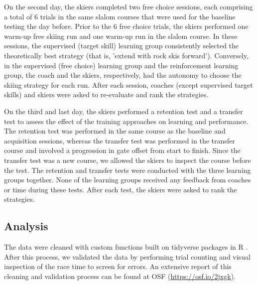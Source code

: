 \documentclass[pdflatex,sn-nature]{sn-jnl}%
\theoremstyle{thmstyleone}%
\theoremstyle{thmstyletwo}%
\theoremstyle{thmstylethree}%
\begin{document}
On the second day, the skiers completed two free choice sessions, each comprising a total of 6 trials in the same slalom courses that were used for the baseline testing the day before. Prior to the 6 free choice trials, the skiers performed one warm-up free skiing run and one warm-up run in the slalom course. In these sessions, the supervised (target skill) learning group consistently selected the theoretically best strategy (that is, 'extend with rock skis forward'). Conversely, in the supervised (free choice) learning group and the reinforcement learning group, the coach and the skiers, respectively, had the autonomy to choose the skiing strategy for each run. After each session, coaches (except supervised target skills) and skiers were asked to re-evaluate and rank the strategies.

On the third and last day, the skiers performed a retention test and a transfer test to assess the effect of the training approaches on learning and performance. The retention test was performed in the same course as the baseline and acquisition sessions, whereas the transfer test was performed in the transfer course and involved a progression in gate offset from start to finish. Since the transfer test was a new course, we allowed the skiers to inspect the course before the test. The retention and transfer tests were conducted with the three learning groups together. None of the learning groups received any feedback from coaches or time during these tests. After each test, the skiers were asked to rank the strategies.


\subsection{Analysis}
The data were cleaned with custom functions built on tidyverse \cite{wickham_welcome_2019} packages in R \cite{r_core_team_r_2022}. After this process, we validated the data by performing trial counting and visual inspection of the race time to screen for errors. An extensive report of this cleaning and validation process can be found at OSF  (\url{https://osf.io/2jxgk}).
\end{document}
